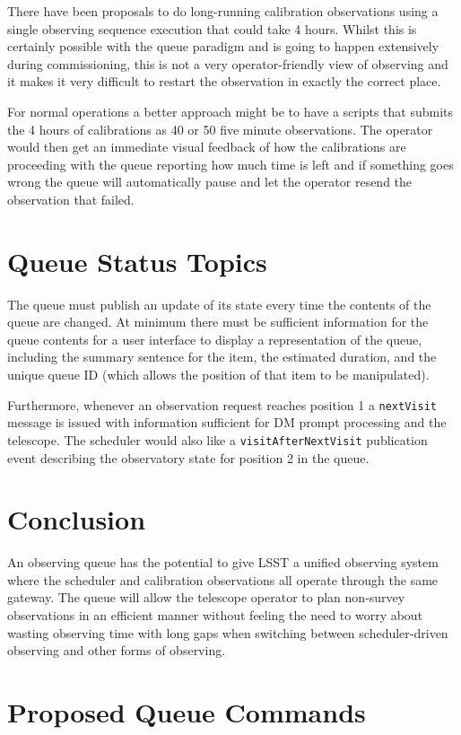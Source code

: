 \documentclass[TS,toc,lsstdraft]{lsstdoc}
\begin{document}
There have been proposals to do long-running calibration observations using a single observing sequence execution that could take 4 hours.
Whilst this is certainly possible with the queue paradigm and is going to happen extensively during commissioning, this is not a very operator-friendly view of observing and it makes it very difficult to restart the observation in exactly the correct place.

For normal operations a better approach might be to have a scripts that submits the 4 hours of calibrations as 40 or 50 five minute observations.
The operator would then get an immediate visual feedback of how the calibrations are proceeding with the queue reporting how much time is left and if something goes wrong the queue will automatically pause and let the operator resend the observation that failed.

\section{Queue Status Topics}

The queue must publish an update of its state every time the contents of the queue are changed.
At minimum there must be sufficient information for the queue contents for a user interface to display a representation of the queue, including the summary sentence for the item, the estimated duration, and the unique queue ID (which allows the position of that item to be manipulated).

Furthermore, whenever an observation request reaches position 1 a \texttt{nextVisit} message is issued with information sufficient for DM prompt processing and the telescope.
The scheduler would also like a \texttt{visitAfterNextVisit} publication event describing the observatory state for position 2 in the queue.

\section{Conclusion}

An observing queue has the potential to give LSST a unified observing system where the scheduler and calibration observations all operate through the same gateway.
The queue will allow the telescope operator to plan non-survey observations in an efficient manner without feeling the need to worry about wasting observing time with long gaps when switching between scheduler-driven observing and other forms of observing.

\appendix
\section{Proposed Queue Commands}
\end{document}
